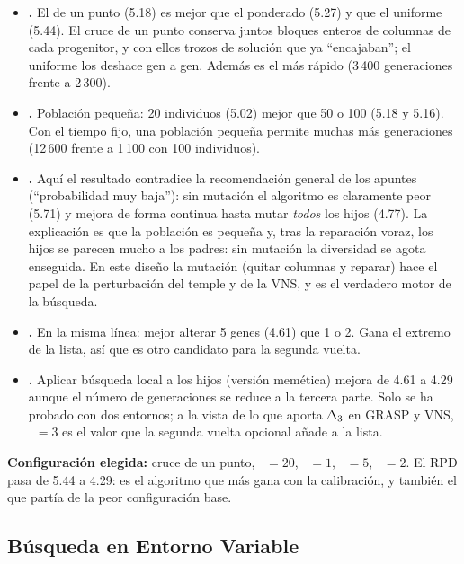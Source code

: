 \begin{itemize}
  \item \textbf{.} El de un punto (5.18) es mejor que el ponderado (5.27) y que
        el uniforme (5.44). El cruce de un punto conserva juntos bloques enteros de columnas
        de cada progenitor, y con ellos trozos de solución que ya ``encajaban''; el uniforme
        los deshace gen a gen. Además es el más rápido (3\,400 generaciones frente a 2\,300).
  \item \textbf{.} Población pequeña: 20 individuos (5.02) mejor que 50 o 100
        (5.18 y 5.16). Con el tiempo fijo, una población pequeña permite muchas más
        generaciones (12\,600 frente a 1\,100 con 100 individuos).
  \item \textbf{.} Aquí el resultado contradice la recomendación general de los
        apuntes (``probabilidad muy baja''): sin mutación el algoritmo es claramente peor
        (5.71) y mejora de forma continua hasta mutar \emph{todos} los hijos (4.77). La
        explicación es que la población es pequeña y, tras la reparación voraz, los hijos
        se parecen mucho a los padres: sin mutación la diversidad se agota enseguida. En
        este diseño la mutación (quitar columnas y reparar) hace el papel de la perturbación
        del temple y de la VNS, y es el verdadero motor de la búsqueda.
  \item \textbf{.} En la misma línea: mejor alterar 5 genes (4.61) que 1 o 2. Gana
        el extremo de la lista, así que es otro candidato para la segunda vuelta.
  \item \textbf{.} Aplicar búsqueda local a los hijos (versión memética) mejora de
        4.61 a 4.29 aunque el número de generaciones se reduce a la tercera parte. Solo se
        ha probado con dos entornos; a la vista de lo que aporta $\Delta_{3}$ en GRASP y VNS,
        ~$=3$ es el valor que la segunda vuelta opcional añade a la lista.
\end{itemize}

\textbf{Configuración elegida:} cruce de un punto, ~$=20$, ~$=1$,
~$=5$, ~$=2$. El RPD pasa de 5.44 a 4.29: es el algoritmo que más gana con
la calibración, y también el que partía de la peor configuración base.

\subsection{Búsqueda en Entorno Variable}\label{sec:cal-vns}

